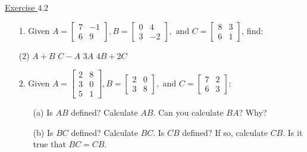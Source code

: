 \documentclass{./../../Latex/handout}
\begin{document}
\thispagestyle{plain}

\underline{Exercise $4.2$}
\begin{itemize}

\item[1.] Given $A=\left[\begin{array}{cc}7 & -1 \\ 6 & 9\end{array}\right],  B=\left[\begin{array}{cc}0 & 4 \\ 3 & -2\end{array}\right], \text{ and }C=\left[\begin{array}{ll}8 & 3 \\ 6 & 1\end{array}\right]$, find: 
\begin{tasks}(2)
	\task[(a)] $A+B$
	\task[(b)] $C-A$
	\task[(c)] $3A$
	\task[(d)] $4B+2C$ 
\end{tasks} 

\item[2.] Given $A = \left[\begin{array}{cc}
2 & 8 \\
3 & 0 \\
5 & 1
\end{array}\right], B=\left[\begin{array}{cc} 2 & 0 \\ 3 & 8\end{array}\right], \text{ and }
C=\left[\begin{array}{cc} 7 & 2 \\ 6 & 3\end{array}\right]$:
\begin{enumerate}
	\item[(a)] Is $AB$ defined? Calculate $AB$. Can you calculate $BA$? Why?
	\item[(b)] Is $BC$ defined? Calculate $BC$. Is $CB$ defined? If so, calculate $CB$. Is it true that $BC=CB$. 
\end{enumerate}


\end{itemize}
\end{document}
